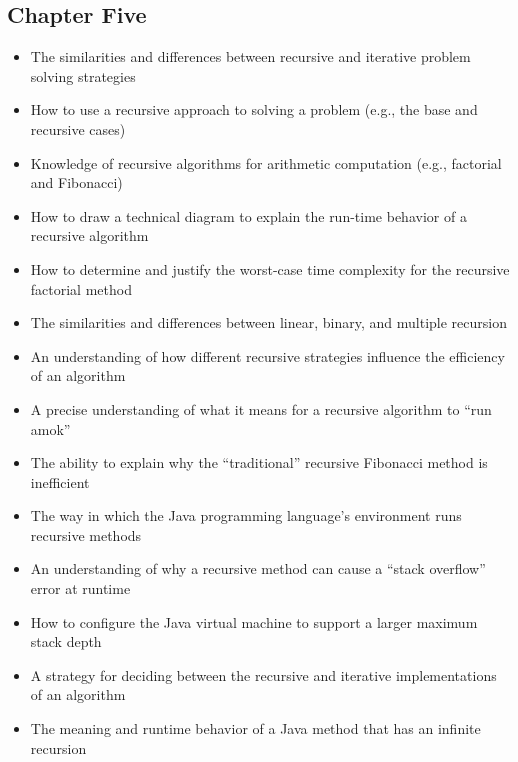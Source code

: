 \documentclass[11pt]{article}
\begin{document}

\vspace*{-.2in}
\subsection*{Chapter Five}

\begin{itemize}

  \item The similarities and differences between recursive and iterative problem
    solving strategies

  \item How to use a recursive approach to solving a problem (e.g., the base
    and recursive cases)

  \item Knowledge of recursive algorithms for arithmetic computation (e.g., factorial
    and Fibonacci)

  \item How to draw a technical diagram to explain the run-time behavior of a
    recursive algorithm

  \item How to determine and justify the worst-case time complexity for
    the recursive factorial method

  \item The similarities and differences between linear, binary, and multiple
    recursion

  \item An understanding of how different recursive strategies influence the
    efficiency of an algorithm

  \item A precise understanding of what it means for a recursive algorithm to
    ``run amok''

  \item The ability to explain why the ``traditional'' recursive Fibonacci
    method is inefficient

  \item The way in which the Java programming language's environment runs
    recursive methods

  \item An understanding of why a recursive method can cause a ``stack
    overflow'' error at runtime

  \item How to configure the Java virtual machine to support a larger maximum
    stack depth

  \item A strategy for deciding between the recursive and iterative
    implementations of an algorithm

  \item The meaning and runtime behavior of a Java method that has an infinite
    recursion

\end{itemize}
\end{document}
